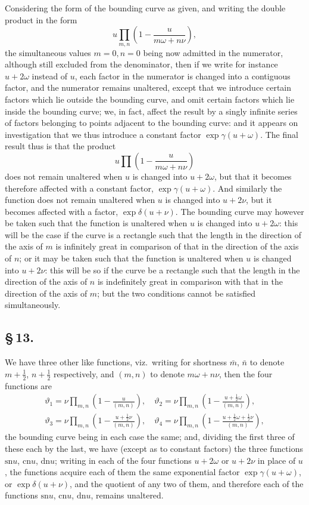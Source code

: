 \documentclass[11pt,a4paper]{book}
\providecommand{\sn}{\mathrm{sn}}
\providecommand{\cn}{\mathrm{cn}}
\providecommand{\dn}{\mathrm{dn}}
\begin{document}
Considering the form of the bounding curve as given, and writing the double product in the form
\[
u \prod_{m,n}\left(1 - \frac{u}{m\omega + n\nu}\right),
\]
the simultaneous values $m = 0, n = 0$ being now admitted in the numerator, although still excluded from the denominator, then if we write for instance $u + 2\omega$ instead of $u$, each factor in the numerator is changed into a contiguous factor, and the numerator remains unaltered, except that we introduce certain factors which lie outside the bounding curve, and omit certain factors which lie inside the bounding curve; we, in fact, affect the result by a singly infinite series of factors belonging to points adjacent to the bounding curve: and it appears on investigation that we thus introduce a constant factor $\exp\gamma(u + \omega)$. The final result thus is that the product
\[
u \prod\left(1 - \frac{u}{m\omega + n\nu}\right)
\]
does not remain unaltered when $u$ is changed into $u + 2\omega$, but that it becomes therefore affected with a constant factor, $\exp\gamma(u + \omega)$. And similarly the function does not remain unaltered when $u$ is changed into $u + 2\nu$, but it becomes affected with a factor, $\exp\delta(u + \nu)$. The bounding curve may however be taken such that the function is unaltered when $u$ is changed into $u + 2\omega$: this will be the case if the curve is a rectangle such that the length in the direction of the axis of $m$ is infinitely great in comparison of that in the direction of the axis of $n$; or it may be taken such that the function is unaltered when $u$ is changed into $u + 2\nu$: this will be so if the curve be a rectangle such that the length in the direction of the axis of $n$ is indefinitely great in comparison with that in the direction of the axis of $m$; but the two conditions cannot be satisfied simultaneously.

\subsection*{\S\,13.}

We have three other like functions, viz.\ writing for shortness $\bar{m}$, $\bar{n}$ to denote $m + \frac{1}{2}$, $n + \frac{1}{2}$ respectively, and $(m, n)$ to denote $m\omega + n\nu$, then the four functions are
\begin{multline*}
\vartheta_{1} = \nu \prod_{m,n}\left(1 - \frac{u}{(m, n)}\right), \quad
\vartheta_{2} = \nu \prod_{m,n}\left(1 - \frac{u + \frac{1}{2}\omega}{(m, n)}\right), \\
\vartheta_{3} = \nu \prod_{m,n}\left(1 - \frac{u + \frac{1}{2}\nu}{(m, n)}\right), \quad
\vartheta_{4} = \nu \prod_{m,n}\left(1 - \frac{u + \frac{1}{2}\omega + \frac{1}{2}\nu}{(m, n)}\right),
\end{multline*}
the bounding curve being in each case the same; and, dividing the first three of these each by the last, we have (except as to constant factors) the three functions $\sn u$, $\cn u$, $\dn u$; writing in each of the four functions $u + 2\omega$ or $u + 2\nu$ in place of $u$, the functions acquire each of them the same exponential factor $\exp\gamma(u + \omega)$, or $\exp\delta(u + \nu)$, and the quotient of any two of them, and therefore each of the functions $\sn u$, $\cn u$, $\dn u$, remains unaltered.
\end{document}
